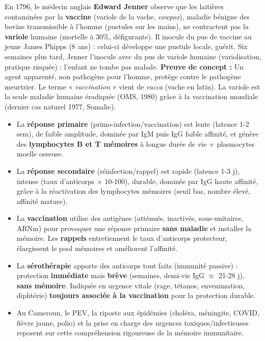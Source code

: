 \documentclass[11pt]{article}
\begin{document}
\begin{savaistu}
En 1796, le médecin anglais \textbf{Edward Jenner} observe que les laitières contaminées par la \textbf{vaccine} (variole de la vache, \emph{cowpox}), maladie bénigne des bovins transmissible à l'homme (pustules sur les mains), ne contractent pas la \textbf{variole} humaine (mortelle à 30\%, défigurante). Il inocule du pus de vaccine au jeune James Phipps (8 ans) : celui-ci développe une pustule locale, guérit. Six semaines plus tard, Jenner l'inocule avec du pus de variole humaine (variolisation, pratique risquée) : l'enfant ne tombe pas malade. \textbf{Preuve de concept :} Un agent apparenté, non pathogène pour l'homme, protège contre le pathogène meurtrier. Le terme « \emph{vaccination} » vient de \emph{vacca} (vache en latin). La variole est la seule maladie humaine éradiquée (OMS, 1980) grâce à la vaccination mondiale (dernier cas naturel 1977, Somalie).
\end{savaistu}

\begin{aretenir}
\begin{itemize}
    \item La \textbf{réponse primaire} (primo-infection/vaccination) est lente (latence 1-2 sem), de faible amplitude, dominée par IgM puis IgG faible affinité, et génère des \textbf{lymphocytes B et T mémoires} à longue durée de vie + plasmocytes moelle osseuse.
    \item La \textbf{réponse secondaire} (réinfection/rappel) est rapide (latence 1-3 j), intense (taux d'anticorps $\times$ 10-100), durable, dominée par IgG haute affinité, grâce à la réactivation des lymphocytes mémoires (seuil bas, nombre élevé, affinité mature).
    \item La \textbf{vaccination} utilise des antigènes (atténués, inactivés, sous-unitaires, ARNm) pour provoquer une réponse primaire \textbf{sans maladie} et installer la mémoire. Les \textbf{rappels} entretiennent le taux d'anticorps protecteur, élargissent le pool mémoires et améliorent l'affinité.
    \item La \textbf{sérothérapie} apporte des anticorps tout faits (immunité passive) : protection \textbf{immédiate} mais \textbf{brève} (semaines, demi-vie IgG $\approx$ 21-28 j), \textbf{sans mémoire}. Indiquée en urgence vitale (rage, tétanos, envenimation, diphtérie) \textbf{toujours associée à la vaccination} pour la protection durable.
    \item Au Cameroun, le PEV, la riposte aux épidémies (choléra, méningite, COVID, fièvre jaune, polio) et la prise en charge des urgences toxiques/infectieuses reposent sur cette compréhension rigoureuse de la mémoire immunitaire.
\end{itemize}
\end{aretenir}
\end{document}
